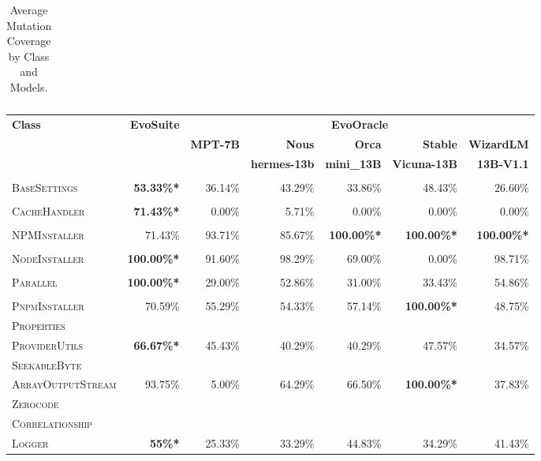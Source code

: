 \begin{table}[H]
\begin{tabular}{| l | r | r | r | r | r | r |}
\end{tabular}
\caption{Average Mutation Coverage by Class and Models.}
\label{tab:mutation_coverage}
\end{table}

\begin{table}[H]
\centering

\begin{tabular}{| l | r | r | r | r | r | r |}
\hline
\multirow{2}{*}{\textbf{Class}} & \multirow{2}{*}{\textbf{EvoSuite}} & \multicolumn{5}{c|}{\textbf{EvoOracle}} \\ %
\cline{3-7} %
 &  & \textbf{MPT-7B} & \textbf{Nous} & \textbf{Orca} & \textbf{Stable} & \textbf{WizardLM} \\
 &  &  & \textbf{hermes-13b} & \textbf{mini\_13B} & \textbf{Vicuna-13B} & \textbf{13B-V1.1} \\
\hline
\scriptsize\textsc{} &  &  &  &  &  &  \\
\scriptsize\textsc{BaseSettings} & \textbf{53.33\%*} & 36.14\% & 43.29\% & 33.86\% & 48.43\% & 26.60\% \\
\hline
\scriptsize\textsc{} &  &  &  &  &  &  \\
\scriptsize\textsc{CacheHandler} & \textbf{71.43\%*} & 0.00\% & 5.71\% & 0.00\% & 0.00\% & 0.00\% \\
\hline
\scriptsize\textsc{} &  &  &  &  &  &  \\
\scriptsize\textsc{NPMInstaller} & 71.43\% & 93.71\% & 85.67\% & \textbf{100.00\%*} & \textbf{100.00\%*} & \textbf{100.00\%*} \\
\hline
\scriptsize\textsc{} &  &  &  &  &  &  \\
\scriptsize\textsc{NodeInstaller} & \textbf{100.00\%*} & 91.60\% & 98.29\% & 69.00\% & 0.00\% & 98.71\% \\
\hline
\scriptsize\textsc{} &  &  &  &  &  &  \\
\scriptsize\textsc{Parallel} & \textbf{100.00\%*} & 29.00\% & 52.86\% & 31.00\% & 33.43\% & 54.86\% \\
\hline
\scriptsize\textsc{} &  &  &  &  &  &  \\
\scriptsize\textsc{PnpmInstaller} & 70.59\% & 55.29\% & 54.33\% & 57.14\% & \textbf{100.00\%*} & 48.75\% \\
\hline
\scriptsize\textsc{Properties} &  &  &  &  &  &  \\
\scriptsize\textsc{ProviderUtils} & \textbf{66.67\%*} & 45.43\% & 40.29\% & 40.29\% & 47.57\% & 34.57\% \\
\hline
\scriptsize\textsc{SeekableByte} &  &  &  &  &  &  \\
\scriptsize\textsc{ArrayOutputStream} & 93.75\% & 5.00\% & 64.29\% & 66.50\% & \textbf{100.00\%*} & 37.83\% \\
\hline
\scriptsize\textsc{Zerocode} &  &  &  &  &  &  \\
\scriptsize\textsc{Correlationship} &  &  &  &  &  &  \\
\scriptsize\textsc{Logger} & \textbf{55\%*} & 25.33\% & 33.29\% & 44.83\% & 34.29\% & 41.43\% \\
\hline


\end{tabular}
\end{table}
